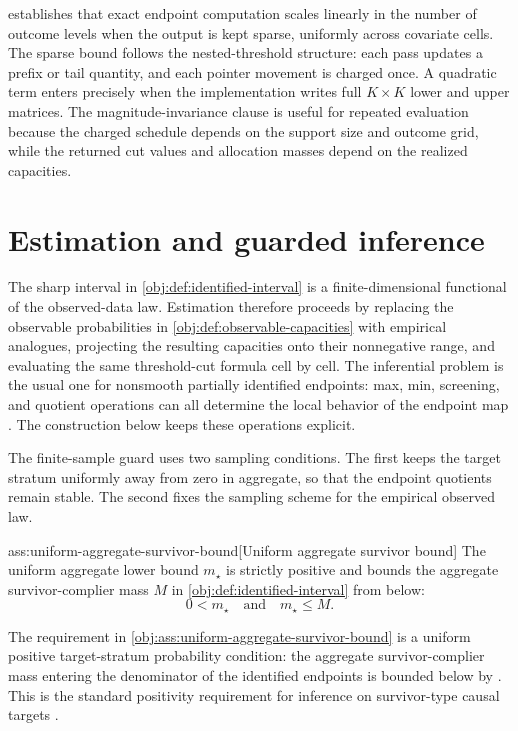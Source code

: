 \documentclass[11pt]{article}
\begin{document}
 establishes that exact endpoint computation scales linearly in the number of outcome levels when the output is kept sparse, uniformly across covariate cells.  The sparse bound follows the nested-threshold structure: each pass updates a prefix or tail quantity, and each pointer movement is charged once.  A quadratic term enters precisely when the implementation writes full \(K\times K\) lower and upper matrices.  The magnitude-invariance clause is useful for repeated evaluation because the charged schedule depends on the support size and outcome grid, while the returned cut values and allocation masses depend on the realized capacities.


\section{Estimation and guarded inference}\label{sec:inference}

The sharp interval in \cref{obj:def:identified-interval} is a finite-dimensional functional of the observed-data law.  Estimation therefore proceeds by replacing the observable probabilities in \cref{obj:def:observable-capacities} with empirical analogues, projecting the resulting capacities onto their nonnegative range, and evaluating the same threshold-cut formula cell by cell.  The inferential problem is the usual one for nonsmooth partially identified endpoints: max, min, screening, and quotient operations can all determine the local behavior of the endpoint map \citep{ImbensManski2004,ChernozhukovHongTamer2007,Tamer2010,Molinari2020,FangSantos2019}.  The construction below keeps these operations explicit.

The finite-sample guard uses two sampling conditions.  The first keeps the target stratum uniformly away from zero in aggregate, so that the endpoint quotients remain stable.  The second fixes the sampling scheme for the empirical observed law.

\begin{assumptionv}{ass:uniform-aggregate-survivor-bound}[Uniform aggregate survivor bound]
The uniform aggregate lower bound \(m_{\star}\) is strictly positive and bounds the aggregate survivor-complier mass \(M\) in \cref{obj:def:identified-interval} from below:
\[
0<m_{\star}
\quad\text{and}\quad
m_{\star}\le M.
\]
\end{assumptionv}

The requirement in \cref{obj:ass:uniform-aggregate-survivor-bound} is a uniform positive target-stratum probability condition: the aggregate survivor-complier mass entering the denominator of the identified endpoints is bounded below by .  This is the standard positivity requirement for inference on survivor-type causal targets \citep{KennedyHarrisKeele2019}.
\end{document}
